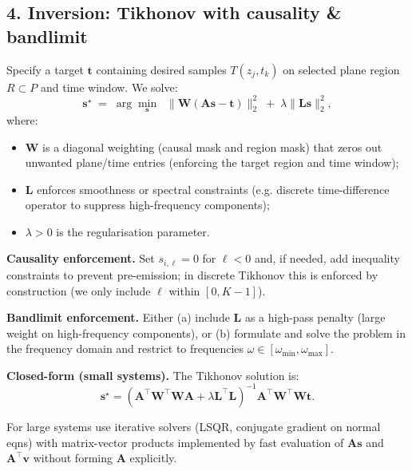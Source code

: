 \documentclass[11pt]{article}
\theoremstyle{plain}
\theoremstyle{definition}
\theoremstyle{remark}
\begin{document}
\subsection*{4. Inversion: Tikhonov with causality \& bandlimit}
Specify a target $\mathbf{t}$ containing desired samples $T(z_j,t_k)$ on selected
plane region $R\subset P$ and time window. We solve:
\[
\mathbf{s}^\star
\;=\;
\arg\min_{\mathbf{s}}
\;\;
\|\mathbf{W}(\mathbf{A}\mathbf{s}-\mathbf{t})\|_2^2
\;+\;\lambda\|\mathbf{L}\mathbf{s}\|_2^2,
\]
where:
\begin{itemize}
  \item $\mathbf{W}$ is a diagonal weighting (causal mask and region mask) that zeros
        out unwanted plane/time entries (enforcing the target region and time window);
  \item $\mathbf{L}$ enforces smoothness or spectral constraints (e.g. discrete
        time-difference operator to suppress high-frequency components);
  \item $\lambda>0$ is the regularisation parameter.
\end{itemize}

\noindent\textbf{Causality enforcement.} Set $s_{i,\ell}=0$ for $\ell<0$ and, if needed,
add inequality constraints to prevent pre-emission; in discrete Tikhonov this is
enforced by construction (we only include $\ell$ within $[0,K-1]$).

\noindent\textbf{Bandlimit enforcement.} Either (a) include $\mathbf{L}$ as a high-pass
penalty (large weight on high-frequency components), or (b) formulate and solve the
problem in the frequency domain and restrict to frequencies $\omega\in[\omega_{\min},\omega_{\max}]$.

\noindent\textbf{Closed-form (small systems).} The Tikhonov solution is:
\[
\mathbf{s}^\star = (\mathbf{A}^\top\mathbf{W}^\top\mathbf{W}\mathbf{A} + \lambda \mathbf{L}^\top\mathbf{L})^{-1}
\mathbf{A}^\top\mathbf{W}^\top\mathbf{W}\mathbf{t}.
\]

For large systems use iterative solvers (LSQR, conjugate gradient on normal eqns)
with matrix-vector products implemented by fast evaluation of $\mathbf{A}\mathbf{s}$
and $\mathbf{A}^\top \mathbf{v}$ without forming $\mathbf{A}$ explicitly.
\end{document}
